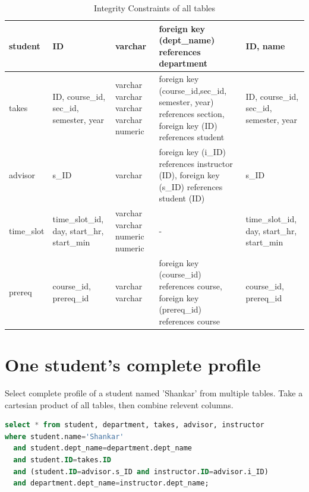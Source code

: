 \documentclass{article}
\begin{document}
\clearpage

    \begin{table}[ht]
\begin{tabular}{||p{2cm}||p{2cm}||p{2cm}||p{3cm}||p{2cm}||}
\hline \hline
 
student & ID & varchar & foreign key (dept\_name) references department & ID, name \\ \hline \hline

takes & ID, course\_id, sec\_id, semester, year & varchar \newline varchar \newline varchar \newline varchar \newline numeric & foreign key (course\_id,sec\_id, semester, year) references section,
	 foreign key (ID) references student & ID, course\_id, sec\_id, semester, year \\ \hline \hline

advisor & s\_ID  & varchar & foreign key (i\_ID) references instructor (ID), foreign key (s\_ID) references student (ID) & s\_ID \\ \hline \hline

time\_slot & time\_slot\_id, day, start\_hr, start\_min & varchar \newline varchar \newline numeric \newline numeric & - & time\_slot\_id, day, start\_hr, start\_min \\ \hline \hline
	 
prereq & course\_id, prereq\_id & varchar \newline varchar & foreign key (course\_id) references course,
	 foreign key (prereq\_id) references course & course\_id, prereq\_id\\ \hline \hline
	 

\end{tabular}
\caption{Integrity Constraints of all tables}
\end{table}

\newpage
\section{One student's complete profile}
Select complete profile of a student named 'Shankar' from multiple tables.
Take a cartesian product of all tables, then combine relevent columns.
\begin{lstlisting}[language=sql]
select * from student, department, takes, advisor, instructor
where student.name='Shankar' 
  and student.dept_name=department.dept_name 
  and student.ID=takes.ID 
  and (student.ID=advisor.s_ID and instructor.ID=advisor.i_ID) 
  and department.dept_name=instructor.dept_name;
\end{lstlisting}
\end{document}
